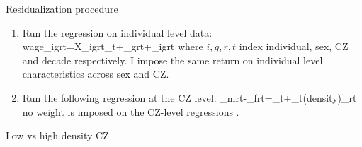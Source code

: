\begin{frame}{Residualization procedure}
	\label{slide:residual}
	\begin{enumerate}
		\item Run the regression on \alert{individual} level data:
		\beqns
			wage_{igrt}=X_{igrt}\gamma_t+\lambda_{grt}+\varepsilon_{igrt}
		\eeqns
		where $i,g,r,t$ index individual, sex, CZ and decade respectively. I impose the \alert{same} return on individual level characteristics across sex and CZ.
		\item Run the following regression at the CZ level:
		\beqns
			\lambda_{mrt}-\lambda_{frt}=\alpha_t+\beta_{t}\ln(density)_{rt}
		\eeqns
		no weight is imposed on the CZ-level regressions \citep{Solon2015a}.
	\end{enumerate}
\end{frame}
\begin{frame}{Low vs high density CZ}
	\label{slide:distribution}
	
\end{frame}